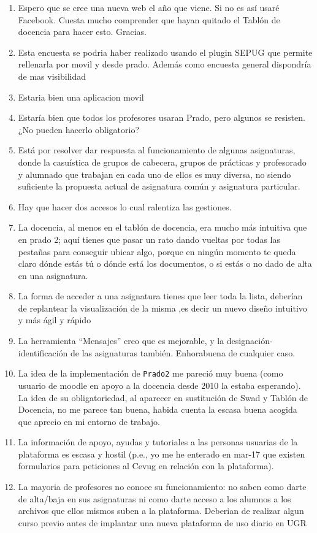 \begin{enumerate}
\item Espero que se cree una nueva web el año que viene. Si no es así usaré Facebook. Cuesta mucho comprender que hayan quitado el Tablón de docencia para hacer esto. Gracias.
\item Esta encuesta se podria haber realizado usando el plugin SEPUG que permite rellenarla por movil y desde prado. Además como encuesta general dispondría de mas visibilidad
\item Estaria bien una aplicacion movil
\item Estaría bien que todos los profesores usaran Prado, pero algunos se resisten. ¿No pueden hacerlo obligatorio?
\item Está por resolver dar respuesta al funcionamiento de algunas asignaturas, donde la casuística de grupos de cabecera, grupos de prácticas y profesorado y alumnado que trabajan en cada uno de ellos es muy diversa, no siendo suficiente la propuesta actual de asignatura común y asignatura particular.
\item Hay que hacer dos accesos lo cual ralentiza las gestiones.
\item La docencia, al menos en el tablón de docencia, era mucho más intuitiva que en prado 2; aquí tienes que pasar un rato dando vueltas por todas las pestañas para conseguir ubicar algo, porque en ningún momento te queda claro dónde estás tú o dónde está los documentos, o si estás o no dado de alta en una asignatura.
\item La forma de acceder a una asignatura tienes que leer toda la lista, deberían de replantear la visualización de la misma ,es decir un nuevo diseño intuitivo y más ágil y rápido
\item La herramienta ``Mensajes'' creo que es mejorable, y la designación-identificación de las asignaturas también. Enhorabuena de cualquier caso.
\item La idea de la implementación de \texttt{Prado2} me pareció muy buena (como usuario de moodle en apoyo a la docencia desde 2010 la estaba esperando). La idea de su obligatoriedad, al aparecer en sustitución de Swad y Tablón de Docencia, no me parece tan buena, habida cuenta la escasa buena acogida que aprecio en mi entorno de trabajo.
\item La información de apoyo, ayudas y tutoriales a las personas usuarias de la plataforma es escasa y hostil (p.e., yo me he enterado en mar-17 que existen formularios para peticiones al Cevug en relación con la plataforma).
\item La mayoria de profesores no conoce su funcionamiento: no saben como darte de alta/baja en sus asignaturas ni como darte acceso a los alumnos a los archivos que ellos mismos suben a la plataforma. Deberian de realizar algun curso previo antes de implantar una nueva plataforma de uso diario en UGR

\end{enumerate}
